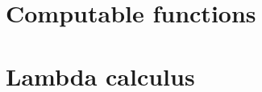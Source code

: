 \documentclass[oneside]{book}
\begin{document}
\part{Computable functions}











\part{Lambda calculus}


\end{document}

